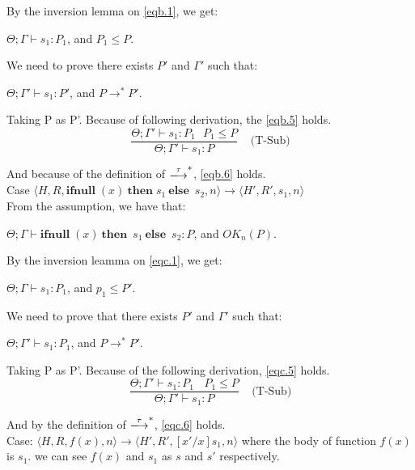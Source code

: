 \documentclass[english]{jssst_ppl} %
\newcommand\Rtab{\; \; \; \;}
\newcommand\IFNULL{\mathbf{ifnull}\;}
\newcommand\THEN{\mathbf{then}\;}
\newcommand\ELSE{\mathbf{else}\;}
\newcommand\Cirx{(x)}
\theoremstyle{definition}
\begin{document}
By the inversion lemma on \eqref{eqb.1}, we get:
\begin{center}
$\Theta; \Gamma \vdash s_{1} : P_{1}$, and $P_{1} \le P$.
\end{center}

We need to prove there exists $P'$ and $\Gamma'$ such that:
\begin{center}
$\Theta; \Gamma' \vdash s_{1} : P'$, and $P \rightarrow^{*} P'$.
\end{center}

Taking P as P'. Because of  following derivation, the \eqref{eqb.5} holds.
$$
   \frac{\Theta; \Gamma' \vdash s_{1} : P_{1} \ \ \ P_{1} \le P}
   {\Theta; \Gamma' \vdash s_{1} : P}
   \Rtab \mbox{(T-Sub)}
$$

And because of the definition of $\xlongrightarrow{\tau}^{*}$, \eqref{eqb.6} holds. \\

\noindent Case $\langle H, R, \IFNULL \Cirx \  \THEN s_{1} \  \ELSE \  s_{2}, n \rangle \rightarrow \langle H', R',s_{1}, n \rangle $\\

From the assumption, we have that:
\begin{center}
$\Theta; \Gamma \vdash \IFNULL \Cirx \  \THEN \  s_{1} \ \ELSE \ s_{2} : P$, and $OK_{n}(P)$.
\end{center}

By the inversion leamma on \eqref{eqc.1}, we get:
\begin{center}
$\Theta; \Gamma \vdash s_{1} : P_{1}$, and $ p_{1} \le P'$.
\end{center}

We need to prove that there exists $P'$ and $\Gamma'$ such that:
\begin{center}
 $\Theta; \Gamma' \vdash s_{1} : P_{1}$, and $P \rightarrow^{*} P'$.
\end{center}

Taking P as P'. Because of the following derivation, \eqref{eqc.5} holds.
$$
  \frac{\Theta; \Gamma' \vdash s_{1} : P_{1} \ \ \ \ P_{1} \le P}
  {\Theta; \Gamma' \vdash s_{1} : P}
  \Rtab \mbox{(T-Sub)}
$$

And by the definition of $\xlongrightarrow{\tau}^{*}$, \eqref{eqc.6} holds. \\

\noindent Case: $\langle H, R, f(x) , n \rangle \rightarrow  \langle H', R', [x'/x]s_{1}, n  \rangle $ where the body of function $f(x)$ is $s_{1}$. we can see $f(x)$ and $s_{1}$ as $s$ and $s'$ respectively. \\
\end{document}
